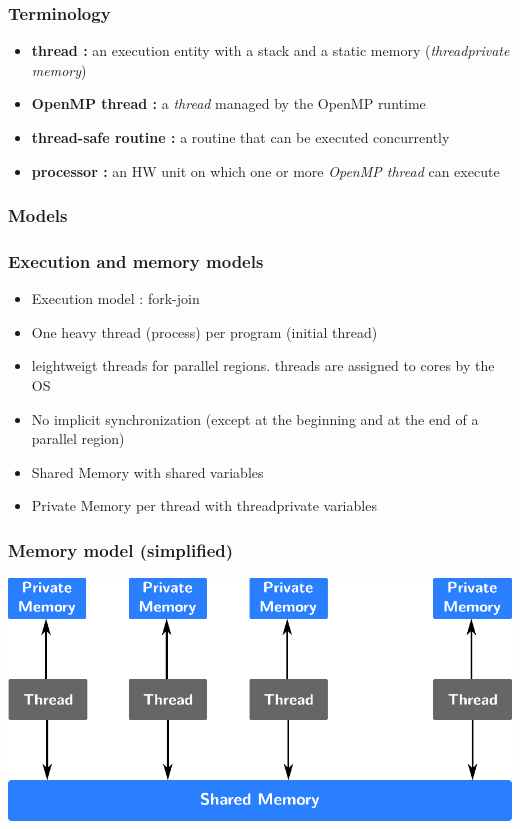 \begin{frame}
  \frametitle{Terminology}
  \begin{itemize}
  \item{\textbf{thread :} an execution entity with a stack and a static memory (\textit{threadprivate memory})}
  \item{\textbf{OpenMP thread :} a \textit{thread} managed by the OpenMP runtime}
  \item{\textbf{thread-safe routine :} a routine that can be executed concurrently}
  \item{\textbf{processor :} an HW unit on which one or more \textit{OpenMP thread} can execute}
  \end{itemize}
\end{frame}

\subsubsection{Models}

\begin{frame}
  \frametitle{Execution and memory models}
  \begin{itemize}
  \item{Execution model : fork-join}
  \item{One heavy thread (process) per program (initial thread)}
  \item{leightweigt threads for parallel regions. threads are assigned to cores by the OS}
  \item{No implicit synchronization (except at the beginning and at the end of a parallel region)}
  \item{Shared Memory with shared variables}
  \item{Private Memory per thread with threadprivate variables}
  \end{itemize}
\end{frame}

\begin{frame}
  \frametitle{Memory model (simplified)}
  \begin{center}
    {\includegraphics[width=\textwidth]{Day1/images/memory-model-simplified.pdf}}
  \end{center}
\end{frame}

